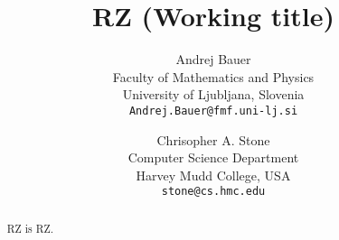 \documentclass{article}
\begin{document}
\title{RZ (Working title)}
\author{
  Andrej Bauer\\
  Faculty of Mathematics and Physics\\
  University of Ljubljana, Slovenia\\
  \texttt{Andrej.Bauer@fmf.uni-lj.si}
  \and
  Chrisopher A. Stone\\
  Computer Science Department\\
  Harvey Mudd College, USA\\
  \texttt{stone@cs.hmc.edu}
}
\maketitle

\begin{abstract}
  RZ is RZ.
\end{abstract}











\end{document}
